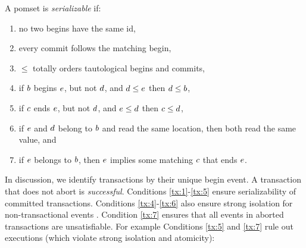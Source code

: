 \begin{definition}
  A pomset is \emph{serializable} if:
  \begin{enumerate}
  \item\label{tx:1} no two begins have the same id,
  \item\label{tx:2} every commit follows the matching begin,
  \item\label{tx:3} $\le$ totally orders tautological begins and commits,
  \item\label{tx:4} if $b$ begins $e$, but not $d$, and $d\le e$ then $d\le b$,
  \item\label{tx:5} if $c$ ends $e$, but not $d$, and $e\le d$ then $c\le d$,
  \item\label{tx:6} if $e$ and $d$ belong to $b$ and read the same
    location, then both read the same value, and
  \item\label{tx:7} if $e$ belongs to $b$, then $e$ implies some
    matching $c$ that ends $e$.
  \end{enumerate}
\end{definition}
In discussion, we identify transactions by their unique begin event.  A
transaction that does not abort is \emph{successful}.
%
Conditions \ref{tx:1}-\ref{tx:5} ensure serializability of committed
transactions.  Conditions \ref{tx:4}-\ref{tx:6} also ensure strong isolation
for non-transactional events
\cite{DBLP:journals/pacmpl/DongolJR18}. Condition \ref{tx:7} ensures that all
events in aborted transactions are unsatisfiable.
%
For example Conditions \ref{tx:5} and \ref{tx:7} rule out
executions (which violate strong isolation and atomicity):

